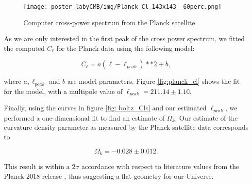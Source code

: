 \begin{figure}
	\begin{minipage}{0.95\textwidth}
		\centering\texttt{[image: poster\_labyCMB/img/Planck\_Cl\_143x143\_\_60perc.png]}
		\caption{Computer cross-power spectrum from the Planck satellite.}
		\label{fig:planck_cls}
	\end{minipage}
\end{figure}

As we are only interested in the first peak of the cross power spectrum, we fitted the computed $C_{\ell}$ for the Planck data using the following model:

\begin{equation}
    C_{\ell} = a(\ell-\ell_{peak})**2 + b,
\end{equation}

where $a, \ell_{peak}$ and $b$ are model parameters. Figure \ref{fig:planck_cl} shows the fit for the model, with a multipole value of $\ell_{peak} = 211.14 \pm 1.10$.

Finally, using the curves in figure \ref{fig: boltz_Cls} and our estimated $\ell_{peak}$, we performed a one-dimensional fit to find an estimate of $\Omega_k$. Our estimate of the curvature density parameter as measured by the Planck satellite data corresponds to 

\begin{equation*}
    \Omega_k = -0.028 \pm 0.012.
\end{equation*}

This result is within a $2\sigma$ accordance with respect to literature values from the Planck 2018 release \cite{planck:2018_main}, thus suggesting a flat geometry for our Universe. 

	
